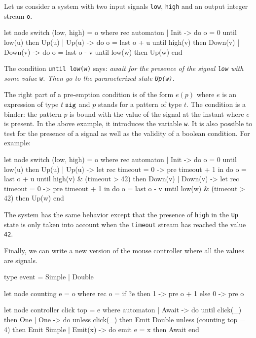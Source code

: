 \documentclass[11pt,titlepage,twoside]{report}
\begin{document}
Let us consider a system with two input signals \verb-low-,
\verb-high- and an output integer stream \verb-o-.

\begin{runverbatim}[withresult]
let node switch (low, high) = o where
  rec automaton
      | Init -> do o = 0 until low(u) then Up(u)
      | Up(u) ->
          do o = last o + u
          until high(v) then Down(v)
      | Down(v) ->
          do o = last o - v
          until low(w) then Up(w)
      end
\end{runverbatim}

The condition \verb-until low(w)- says: {\em await for the presence of
  the signal \verb-low- with some value \verb-w-. Then go to the
  parameterized state \verb-Up(w)-}.

\newcommand{\Signal}[1]{{#1}\;\mbox{\tt sig}}

The right part of a pre-emption condition is of the form $e(p)$ where
$e$ is an expression of type $\Signal{t}$ and $p$ stands for a pattern
of type $t$. The condition is a binder: the pattern $p$ is bound with
the value of the signal at the instant where $e$ is present.  In the
above example, it introduces the variable \verb-w-. It is also
possible to test for the presence of a signal as well as the validity
of a boolean condition. For example:

\begin{runverbatim}[withresult]
let node switch (low, high) = o where
  rec automaton
  | Init -> do o = 0 until low(u) then Up(u)
  | Up(u) ->
      let rec timeout = 0 -> pre timeout + 1 in
      do o = last o + u
      until high(v) & (timeout > 42) then Down(v)
  | Down(v) ->
      let rec timeout = 0 -> pre timeout + 1 in
      do o = last o - v
      until low(w) & (timeout > 42) then Up(w)
  end
\end{runverbatim}
The system has the same behavior except that the presence of
\verb-high- in the \verb-Up- state is only taken into account when the
\verb-timeout- stream has reached the value \verb-42-.

Finally, we can write a new version of the mouse controller where all
the values are signals.

\begin{runverbatim}[withresult]
type event = Simple | Double

let node counting e = o where
  rec o = if ?e then 1 -> pre o + 1 else 0 -> pre o

let node controller click top = e where
  automaton
  | Await ->
     do until click(_) then One
  | One ->
     do unless click(_) then Emit Double
     unless (counting top = 4) then Emit Simple
  | Emit(x) ->
     do emit e = x
     then Await
  end
\end{runverbatim}
\end{document}
